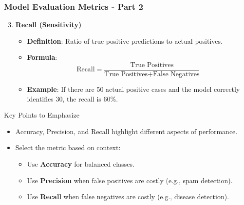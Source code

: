 \documentclass[aspectratio=169]{beamer}
\begin{document}
\begin{frame}[fragile]
    \frametitle{Model Evaluation Metrics - Part 2}
    \begin{enumerate}
        \setcounter{enumi}{2}
        \item \textbf{Recall (Sensitivity)}
            \begin{itemize}
                \item \textbf{Definition}: Ratio of true positive predictions to actual positives.
                \item \textbf{Formula}:
                \begin{equation}
                    \text{Recall} = \frac{\text{True Positives}}{\text{True Positives} + \text{False Negatives}}
                \end{equation}
                \item \textbf{Example}: If there are 50 actual positive cases and the model correctly identifies 30, the recall is 60\%.
            \end{itemize}
    \end{enumerate}
    
    \begin{block}{Key Points to Emphasize}
        \begin{itemize}
            \item Accuracy, Precision, and Recall highlight different aspects of performance.
            \item Select the metric based on context:
                \begin{itemize}
                    \item Use \textbf{Accuracy} for balanced classes.
                    \item Use \textbf{Precision} when false positives are costly (e.g., spam detection).
                    \item Use \textbf{Recall} when false negatives are costly (e.g., disease detection).
                \end{itemize}
        \end{itemize}
    \end{block}
\end{frame}
\end{document}
